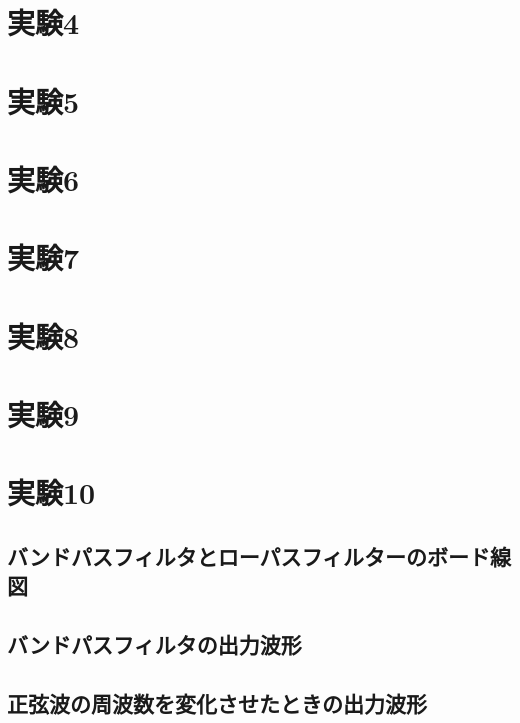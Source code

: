 \documentclass[../../../main]{subfiles}
\begin{document}
\section{実験4}


\clearpage
\section{実験5}


\clearpage
\section{実験6}


\clearpage
\section{実験7}


\clearpage
\section{実験8}


\clearpage
\section{実験9}


\clearpage
\section{実験10}
\subsection*{バンドパスフィルタとローパスフィルターのボード線図}


\clearpage
\subsection*{バンドパスフィルタの出力波形}


\clearpage
\subsection*{正弦波の周波数を変化させたときの出力波形}

\end{document}
